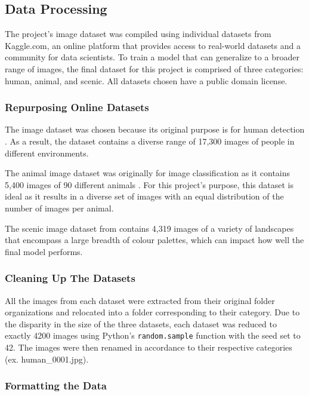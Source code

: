 \documentclass{article} %
\begin{document}
\subsection{Data Processing}

 The project's image dataset was compiled using individual datasets from Kaggle.com, an online platform that provides access to real-world datasets and a community for data scientists. To train a model that can generalize to a broader range of images, the final dataset for this project is comprised of three categories: human, animal, and scenic. All datasets chosen have a public domain license. 

 \subsubsection{Repurposing Online Datasets}

The  image dataset was chosen because its original purpose is for human detection \cite[]{kaggle_human}. As a result, the dataset contains a diverse range of 17,300 images of people in different environments. 

The animal image dataset was originally for image classification as it contains 5,400 images of 90 different animals \cite[]{kaggle_animal}. For this project’s purpose, this dataset is ideal as it results in a diverse set of images with an equal distribution of the number of images per animal. 

The scenic image dataset from \cite{kaggle_scene} contains 4,319 images of a variety of landscapes that encompass a large breadth of colour palettes, which can impact how well the final model performs.

\subsubsection{Cleaning Up The Datasets}
All the images from each dataset were extracted from their original folder organizations and relocated into a folder corresponding to their category. Due to the disparity in the size of the three datasets, each dataset was reduced to exactly 4200 images using Python’s \verb|random.sample| function with the seed set to 42. The images were then renamed in accordance to their respective categories (ex. human\_0001.jpg). 

\subsubsection{Formatting the Data}
\end{document}
